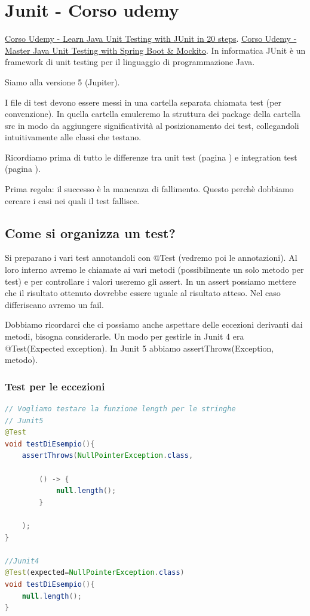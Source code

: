 \documentclass[11pt,a4paper]{book}
\begin{document}
\chapter{Junit - Corso udemy}
\href{https://www.udemy.com/course/junit-tutorial-for-beginners-with-java-examples/}{Corso Udemy - Learn Java Unit Testing with JUnit in 20 steps}.
\href{https://www.udemy.com/course/learn-unit-testing-with-spring-boot/}{Corso Udemy - Master Java Unit Testing with Spring Boot \& Mockito}.
In informatica JUnit è un framework di unit testing per il linguaggio di programmazione Java.

Siamo alla versione 5 (Jupiter). 

I file di test devono essere messi in una cartella separata chiamata test (per convenzione). In quella cartella emuleremo la struttura dei package della cartella src in modo da aggiungere significatività al posizionamento dei test, collegandoli intuitivamente alle classi che testano.

Ricordiamo prima di tutto le differenze tra unit test (pagina \pageref{par: unit test}) e integration test (pagina \pageref{par: integration test}).

Prima regola: il successo è la mancanza di fallimento. Questo perchè dobbiamo cercare i casi nei quali il test fallisce.

\section{Come si organizza un test?}
Si preparano i vari test annotandoli con @Test (vedremo poi le annotazioni). Al loro interno avremo le chiamate ai vari metodi (possibilmente un solo metodo per test) e per controllare i valori useremo gli assert. In un assert possiamo mettere che il risultato ottenuto dovrebbe essere uguale al risultato atteso. Nel caso differiscano avremo un fail.

Dobbiamo ricordarci che ci possiamo anche aspettare delle eccezioni derivanti dai metodi, bisogna considerarle. Un modo per gestirle in Junit 4 era @Test(Expected exception). In Junit 5 abbiamo assertThrows(Exception, metodo).

\subsection{Test per le eccezioni}
\begin{lstlisting}[language = Java]
// Vogliamo testare la funzione length per le stringhe
// Junit5
@Test
void testDiEsempio(){
	assertThrows(NullPointerException.class,
	
		() -> {
			null.length();
		}
		
	);
}

//Junit4
@Test(expected=NullPointerException.class)
void testDiEsempio(){
	null.length();
}

\end{lstlisting}
\end{document}
